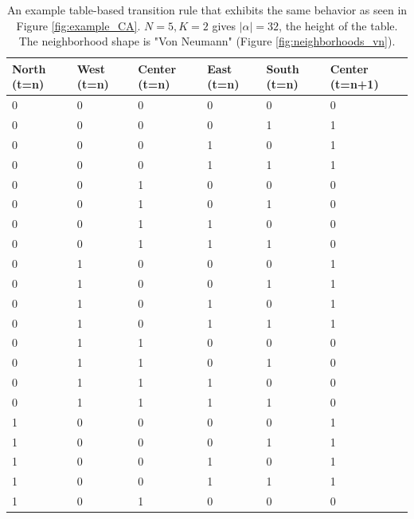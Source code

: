 \begin{table}
    \centering
    \caption[Example table-based transition rule]{An example table-based transition rule that exhibits the same behavior as seen in Figure \ref{fig:example_CA}. $N=5, K=2$ gives $|\alpha|=32$, the height of the table. The neighborhood shape is "Von Neumann" (Figure \ref{fig:neighborhoods_vn}).}
    \begin{tabular}{lllll|l}
    North (t=n) & West (t=n) & Center (t=n) & East (t=n) & South (t=n) & Center (t=n+1) \\ \hline
    0      & 0      & 0      & 0      & 0      & 0        \\
    0      & 0      & 0      & 0      & 1      & 1        \\
    0      & 0      & 0      & 1      & 0      & 1        \\
    0      & 0      & 0      & 1      & 1      & 1        \\
    0      & 0      & 1      & 0      & 0      & 0        \\
    0      & 0      & 1      & 0      & 1      & 0        \\
    0      & 0      & 1      & 1      & 0      & 0        \\
    0      & 0      & 1      & 1      & 1      & 0        \\
    0      & 1      & 0      & 0      & 0      & 1        \\
    0      & 1      & 0      & 0      & 1      & 1        \\
    0      & 1      & 0      & 1      & 0      & 1        \\
    0      & 1      & 0      & 1      & 1      & 1        \\
    0      & 1      & 1      & 0      & 0      & 0        \\
    0      & 1      & 1      & 0      & 1      & 0        \\
    0      & 1      & 1      & 1      & 0      & 0        \\
    0      & 1      & 1      & 1      & 1      & 0        \\
    1      & 0      & 0      & 0      & 0      & 1        \\
    1      & 0      & 0      & 0      & 1      & 1        \\
    1      & 0      & 0      & 1      & 0      & 1        \\
    1      & 0      & 0      & 1      & 1      & 1        \\
    1      & 0      & 1      & 0      & 0      & 0        \\

\end{tabular}
\end{table}
